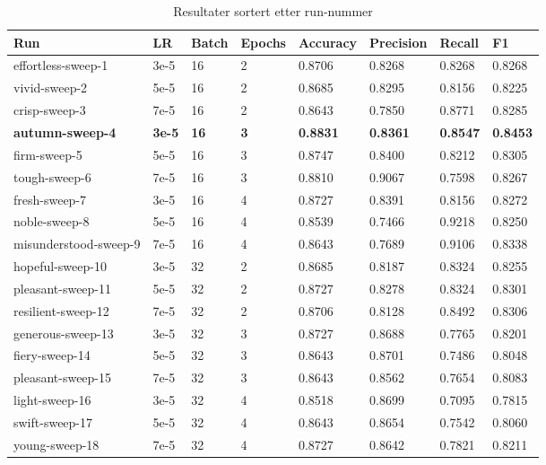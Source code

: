 \begin{table}
\caption{Resultater sortert etter run-nummer}
\label{tab:results}
\begin{tabular}{llllllll}
\toprule
Run & LR & Batch & Epochs & Accuracy & Precision & Recall & F1 \\
\midrule
effortless-sweep-1 & 3e-5 & 16 & 2 & 0.8706 & 0.8268 & 0.8268 & 0.8268 \\
vivid-sweep-2 & 5e-5 & 16 & 2 & 0.8685 & 0.8295 & 0.8156 & 0.8225 \\
crisp-sweep-3 & 7e-5 & 16 & 2 & 0.8643 & 0.7850 & 0.8771 & 0.8285 \\
\textbf{autumn-sweep-4} & \textbf{3e-5} & \textbf{16} & \textbf{3} & \textbf{0.8831} & \textbf{0.8361} & \textbf{0.8547} & \textbf{0.8453} \\
firm-sweep-5 & 5e-5 & 16 & 3 & 0.8747 & 0.8400 & 0.8212 & 0.8305 \\
tough-sweep-6 & 7e-5 & 16 & 3 & 0.8810 & 0.9067 & 0.7598 & 0.8267 \\
fresh-sweep-7 & 3e-5 & 16 & 4 & 0.8727 & 0.8391 & 0.8156 & 0.8272 \\
noble-sweep-8 & 5e-5 & 16 & 4 & 0.8539 & 0.7466 & 0.9218 & 0.8250 \\
misunderstood-sweep-9 & 7e-5 & 16 & 4 & 0.8643 & 0.7689 & 0.9106 & 0.8338 \\
hopeful-sweep-10 & 3e-5 & 32 & 2 & 0.8685 & 0.8187 & 0.8324 & 0.8255 \\
pleasant-sweep-11 & 5e-5 & 32 & 2 & 0.8727 & 0.8278 & 0.8324 & 0.8301 \\
resilient-sweep-12 & 7e-5 & 32 & 2 & 0.8706 & 0.8128 & 0.8492 & 0.8306 \\
generous-sweep-13 & 3e-5 & 32 & 3 & 0.8727 & 0.8688 & 0.7765 & 0.8201 \\
fiery-sweep-14 & 5e-5 & 32 & 3 & 0.8643 & 0.8701 & 0.7486 & 0.8048 \\
pleasant-sweep-15 & 7e-5 & 32 & 3 & 0.8643 & 0.8562 & 0.7654 & 0.8083 \\
light-sweep-16 & 3e-5 & 32 & 4 & 0.8518 & 0.8699 & 0.7095 & 0.7815 \\
swift-sweep-17 & 5e-5 & 32 & 4 & 0.8643 & 0.8654 & 0.7542 & 0.8060 \\
young-sweep-18 & 7e-5 & 32 & 4 & 0.8727 & 0.8642 & 0.7821 & 0.8211 \\
\bottomrule
\end{tabular}
\end{table}
